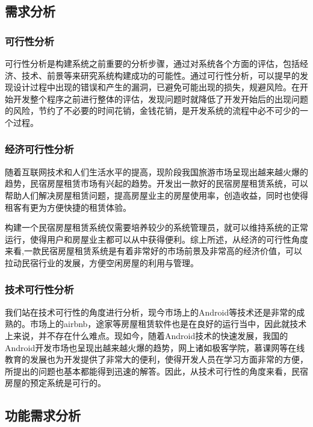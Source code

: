 \documentclass[lang=cn,11pt,a4paper,cite=authoryear]{elegantpaper}
\begin{document}
\subsection{需求分析}

\subsubsection{可行性分析}

可行性分析是构建系统之前重要的分析步骤，通过对系统各个方面的评估，包括经济、技术、前景等来研究系统构建成功的可能性。通过可行性分析，可以提早的发现设计过程中出现的错误和产生的漏洞，已避免可能出现的损失，规避风险。在开始开发整个程序之前进行整体的评估，发现问题时就降低了开发开始后的出现问题的风险，节约了不必要的时间花销，金钱花销，是开发系统的流程中必不可少的一个过程。

\subsubsection{经济可行性分析}

随着互联网技术和人们生活水平的提高，现阶段我国旅游市场呈现出越来越火爆的趋势，民宿房屋租赁市场有兴起的趋势。开发出一款好的民宿房屋租赁系统，可以帮助人们解决房屋租赁问题，提高房屋业主的房屋使用率，创造收益，同时也使得租客有更为方便快捷的租赁体验。

构建一个民宿房屋租赁系统仅需要培养较少的系统管理员，就可以维持系统的正常运行，使得用户和房屋业主都可以从中获得便利。综上所述，从经济的可行性角度来看,一款民宿房屋租赁系统是有着非常好的市场前景及非常高的经济价值，可以拉动民宿行业的发展，方便空闲房屋的利用与管理。

\subsubsection{技术可行性分析}

我们站在技术可行性的角度进行分析，现今市场上的Android等技术还是非常的成熟的。市场上的airbnb，途家等房屋租赁软件也是在良好的运行当中，因此就技术上来说，并不存在什么难点。现如今，随着Android技术的快速发展，我国的Android开发市场也呈现出越来越火爆的趋势，网上诸如极客学院，慕课网等在线教育的发展也为开发提供了非常大的便利，使得开发人员在学习方面非常的方便，所提出的问题也基本都能得到迅速的解答。因此，从技术可行性的角度来看，民宿房屋的预定系统是可行的。

\subsection{功能需求分析}
\end{document}
